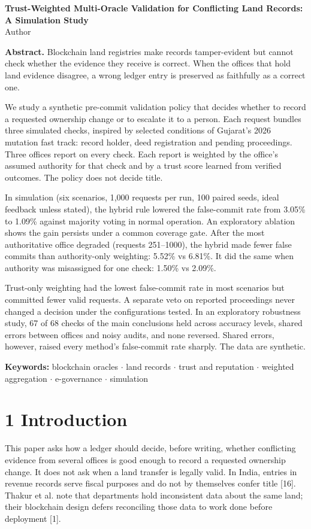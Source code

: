 \documentclass[10pt]{article}
\renewenvironment{abstract}{\small\quotation\noindent\textbf{Abstract.} }{\endquotation}
\begin{document}
\begin{center}{\large\bfseries Trust-Weighted Multi-Oracle Validation for Conflicting Land Records: A Simulation Study}\\[2mm] Author\\[6mm]\end{center}
\begin{abstract}
Blockchain land registries make records tamper-evident but cannot check whether the evidence they receive is correct. When the offices that hold land evidence disagree, a wrong ledger entry is preserved as faithfully as a correct one.

We study a synthetic pre-commit validation policy that decides whether to record a requested ownership change or to escalate it to a person. Each request bundles three simulated checks, inspired by selected conditions of Gujarat's 2026 mutation fast track: record holder, deed registration and pending proceedings. Three offices report on every check. Each report is weighted by the office's assumed authority for that check and by a trust score learned from verified outcomes. The policy does not decide title.

In simulation (six scenarios, 1,000 requests per run, 100 paired seeds, ideal feedback unless stated), the hybrid rule lowered the false-commit rate from 3.05\% to 1.09\% against majority voting in normal operation. An exploratory ablation shows the gain persists under a common coverage gate. After the most authoritative office degraded (requests 251–1000), the hybrid made fewer false commits than authority-only weighting: 5.52\% vs 6.81\%. It did the same when authority was misassigned for one check: 1.50\% vs 2.09\%.

Trust-only weighting had the lowest false-commit rate in most scenarios but committed fewer valid requests. A separate veto on reported proceedings never changed a decision under the configurations tested. In an exploratory robustness study, 67 of 68 checks of the main conclusions held across accuracy levels, shared errors between offices and noisy audits, and none reversed. Shared errors, however, raised every method's false-commit rate sharply. The data are synthetic.

\par\noindent\textbf{Keywords:}  blockchain oracles $\cdot$ land records $\cdot$ trust and reputation $\cdot$ weighted aggregation $\cdot$ e-governance $\cdot$ simulation
\end{abstract}
\section*{1 Introduction}
This paper asks how a ledger should decide, before writing, whether conflicting evidence from several offices is good enough to record a requested ownership change. It does not ask when a land transfer is legally valid. In India, entries in revenue records serve fiscal purposes and do not by themselves confer title [16]. Thakur et al. note that departments hold inconsistent data about the same land; their blockchain design defers reconciling those data to work done before deployment [1].
\end{document}
